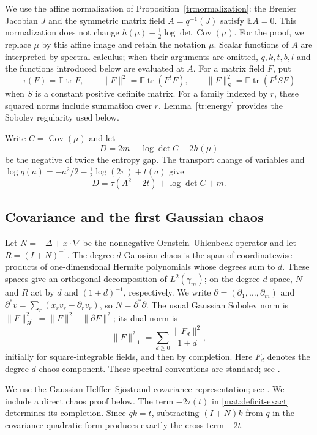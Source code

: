 \documentclass[11pt]{article}
\theoremstyle{definition}
\theoremstyle{remark}
\numberwithin{equation}{section}
\begin{document}
We use the affine normalization of
Proposition~\ref{tr:normalization}: the Brenier Jacobian $J$ and the
symmetric matrix field $A=q^{-1}(J)$ satisfy $\mathbb E A=0$.  This normalization
does not change $h(\mu)-\frac12\log\det\operatorname{Cov}(\mu)$.  For the proof,
we replace $\mu$ by this affine image and retain the notation $\mu$.
Scalar functions of $A$
are interpreted by spectral calculus; when their arguments are omitted,
$q,k,t,b,l$ and the functions introduced below are evaluated at $A$.  For a matrix field $F$, put
\[
 \tau(F)=\mathbb E\operatorname{tr} F,\qquad
 \|F\|^2=\mathbb E\operatorname{tr}(F^tF),\qquad
 \|F\|_S^2=\mathbb E\operatorname{tr}(F^tSF)
\]
when $S$ is a constant positive definite matrix.  For a family indexed
by $r$, these squared norms include summation over $r$.  Lemma~\ref{tr:energy}
provides the Sobolev regularity used below.

Write $C=\operatorname{Cov}(\mu)$ and let
\[
 \mathcal{} D=2m+\log\det C-2h(\mu)
\]
be the negative of twice the entropy gap.  The transport change of variables and
$\log q(a)=-a^2/2-\frac12\log(2\pi)+t(a)$ give
\begin{equation}\label{mat:deficit-exact}
 \mathcal{} D=\tau(A^2-2t)+\log\det C+m.
\end{equation}

\subsection{Covariance and the first Gaussian chaos}

Let $N=-\Delta+x\cdot\nabla$ be the nonnegative Ornstein--Uhlenbeck
operator and let $R=(I+N)^{-1}$.  The degree-$d$ Gaussian chaos is
the span of coordinatewise products of one-dimensional Hermite polynomials whose
degrees sum to $d$.  These spaces give an orthogonal decomposition of
$L^2(\gamma_m)$; on the degree-$d$ space, $N$ and $R$ act by $d$ and
$(1+d)^{-1}$, respectively.
We write $\partial=(\partial_1,\ldots,\partial_m)$ and
$\partial^*v=\sum_r(x_rv_r-\partial_rv_r)$, so $N=\partial^*\partial$.
The usual Gaussian Sobolev norm is
$\|F\|_{H^1}^2=\|F\|^2+\|\partial F\|^2$; its dual norm is
\[
 \|F\|_{-1}^2=\sum_{d\ge0}\frac{\|F_d\|^2}{1+d},
\]
initially for square-integrable fields, and then by completion.
Here $F_d$ denotes the degree-$d$ chaos component.  These spectral
conventions are standard; see \cite[Section~2]{NourdinPeccati2009}.

We use the Gaussian Helffer--Sj\"ostrand covariance representation;
see \cite[Proposition~4.1(ii)]{DuerinckxOtto2020}.  We include a direct
chaos proof below.  The term $-2\tau(t)$ in \eqref{mat:deficit-exact}
determines its completion.  Since $qk=t$, subtracting $(I+N)k$ from
$q$ in the covariance quadratic form produces exactly the cross term
$-2t$.
\end{document}
